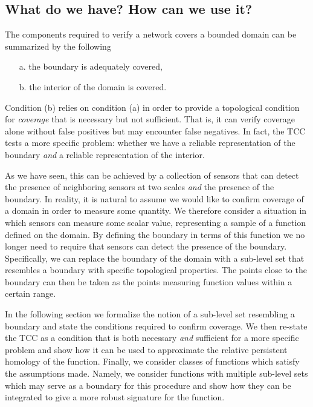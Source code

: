 \subsection{What do we have? How can we use it?}

The components required to verify a network covers a bounded domain can be summarized by the following
\begin{enumerate}
    \item[a.] the boundary is adequately covered,
    \item[b.] the interior of the domain is covered.
\end{enumerate}
Condition (b) relies on condition (a) in order to provide a topological condition for \emph{coverage} that is necessary but not sufficient.
That is, it can verify coverage alone without false positives but may encounter false negatives.
In fact, the TCC tests a more specific problem: whether we have a reliable representation of the boundary \emph{and} a reliable representation of the interior.

As we have seen, this can be achieved by a collection of sensors that can detect the presence of neighboring sensors at two scales \emph{and} the presence of the boundary.
In reality, it is natural to assume we would like to confirm coverage of a domain in order to measure some quantity.
We therefore consider a situation in which sensors can measure some scalar value, representing a sample of a function defined on the domain.
By defining the boundary in terms of this function we no longer need to require that sensors can detect the presence of the boundary.
Specifically, we can replace the boundary of the domain with a sub-level set that resembles a boundary with specific topological properties.
The points close to the boundary can then be taken as the points measuring function values within a certain range.

In the following section we formalize the notion of a sub-level set resembling a boundary and state the conditions required to confirm coverage.
We then re-state the TCC as a condition that is both necessary \emph{and} sufficient for a more specific problem and show how it can be used to approximate the relative persistent homology of the function.
Finally, we consider classes of functions which satisfy the assumptions made.
Namely, we consider functions with multiple sub-level sets which may serve as a boundary for this procedure and show how they can be integrated to give a more robust signature for the function.
